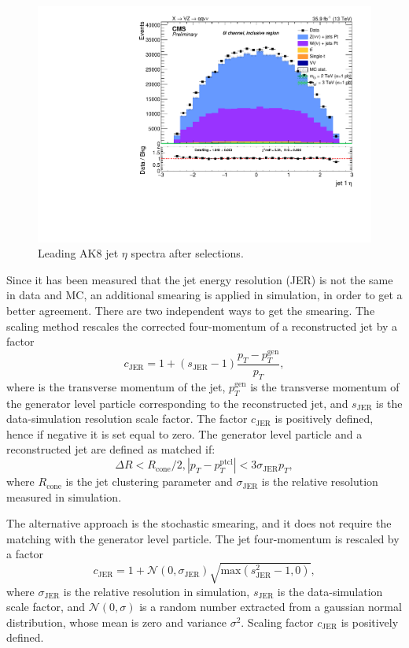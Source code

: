 \begin{figure}[!htb]
  \begin{center}
    \includegraphics[width=.495\textwidth]{plots/v9_U/XVZnnInc/FatJet1_eta.pdf}
  \end{center}
  \caption{Leading AK8 jet $\eta$ spectra after selections.}
  \label{fig:AK8jet_eta}
\end{figure}

\noindent Since it has been measured that the jet energy resolution (JER) is not the same in data and MC, an additional smearing is applied in simulation, in order to get a better agreement. There are two independent ways to get the smearing. The scaling method rescales the corrected four-momentum of a reconstructed jet by a factor
\begin{equation}
c_{\text{JER}} = 1 + (s_{\text{JER}} - 1) \frac{p_T - p_T^{\text{gen}}}{p_T},
\end{equation}
where \pt is the transverse momentum of the jet, $p_T^{\text{gen}}$ is the transverse momentum of the generator level particle corresponding to the reconstructed jet, and $s_{\text{JER}}$ is the data-simulation resolution scale factor. The factor $c_{\text{JER}}$ is positively defined, hence if negative it is set equal to zero. %
The generator level particle and a reconstructed jet are defined as matched if:
\begin{equation}
\Delta R < R_{\text{cone}} / 2, |p_T - p_T^{\text{ptcl}}| < 3 \sigma_{\text{JER}} p_{T},
\end{equation}
where $R_{\text{cone}}$ is the jet clustering parameter and $\sigma_{\text{JER}}$ is the relative \pt resolution measured in simulation.

\noindent The alternative approach is the stochastic smearing, and it does not require the matching with the generator level particle. The jet four-momentum is rescaled by a factor
\begin{equation}
c_{\text{JER}} = 1 + \mathcal{N}(0, \sigma_{\text{JER}}) \sqrt{\text{max}(s_{\text{JER}}^2 - 1, 0)},
\end{equation}
where $\sigma_{\text{JER}}$ is the relative \pt resolution in simulation, $s_{\text{JER}}$ is the data-simulation scale factor, and $\mathcal{N}(0, \sigma)$ 
is a random number extracted from a gaussian normal distribution, whose mean is zero and variance $\sigma^2$. Scaling factor $c_{\text{JER}}$ is positively defined.%

